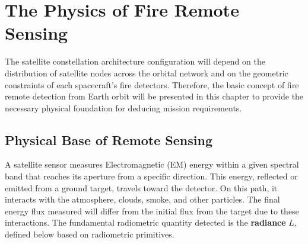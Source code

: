 \chapter{The Physics of Fire Remote
Sensing}\label{chapter-3-the-physics-of-wildfire-remote-sensing}


The satellite constellation architecture configuration will depend on the distribution of satellite nodes across the orbital network and on the geometric constraints of each spacecraft's fire detectors. Therefore, the basic concept of fire remote detection from Earth orbit will be presented in this chapter to provide the necessary physical foundation for deducing mission requirements. 

\section{Physical Base of Remote Sensing}
\label{310-physical-base-of-remote-sensing}

A satellite sensor measures Electromagnetic (EM) energy within a given spectral band that reaches its aperture from a specific direction. This energy, reflected or emitted from a ground target, travels toward the detector. On this path, it interacts with the atmosphere, clouds, smoke, and other particles. The final energy flux measured will differ from the initial flux from the target due to these interactions. The fundamental radiometric quantity detected is the \textbf{radiance} $L$, defined below based on radiometric primitives.

